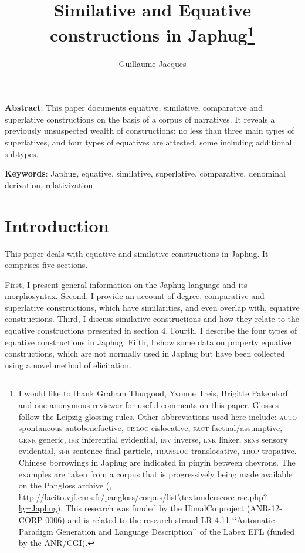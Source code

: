 \documentclass[oneside,a4paper,12pt]{article}
\begin{document}
 

\title{Similative and Equative constructions in Japhug\footnote{ I would like to thank Graham Thurgood, Yvonne Treis, Brigitte Pakendorf and one anonymous reviewer for useful comments on this paper. Glosses follow the Leipzig glossing rules. Other abbreviations used here include: \textsc{auto} spontaneous-autobenefactive, \textsc{cisloc} cislocative,  \textsc{fact} factual/assumptive, \textsc{genr} generic, \textsc{ifr} inferential evidential,  \textsc{inv} inverse, \textsc{lnk} linker,  \textsc{sens} sensory  evidential, \textsc{sfr} sentence final particle, \textsc{transloc} translocative, \textsc{trop} tropative.  Chinese borrowings in Japhug are indicated in pinyin between chevrons. The examples are taken from a corpus that is progressively being made available on the Pangloss archive (\citealt{michailovsky14pangloss}, 
 \url{http://lacito.vjf.cnrs.fr/pangloss/corpus/list\textunderscore rsc.php?lg=Japhug}). This research was funded by the HimalCo project (ANR-12-CORP-0006) and is related to the research strand LR-4.11 ‘‘Automatic Paradigm Generation and Language Description’’ of the Labex EFL (funded by the ANR/CGI).}}
\author{Guillaume Jacques}
\maketitle
 \linespread{1.5}
\textbf{Abstract}: This paper documents equative, similative, comparative and superlative constructions on the basis of a corpus of narratives. It reveals a previously unsuspected wealth of constructions: no less than three main types of superlatives, and four types of equatives are attested, some including additional subtypes.
 
\textbf{Keywords}: Japhug, equative, similative, superlative, comparative, denominal derivation, relativization
\section*{Introduction}
This paper deals with equative and similative constructions in Japhug. It comprises five sections.

 First, I present general information on the Japhug language and its morphosyntax. Second, I provide an account of degree, comparative and superlative constructions, which have similarities, and even overlap with, equative constructions. Third, I discuss similative constructions and how they relate to the equative constructions presented in section 4. Fourth, I describe the four types of equative constructions in Japhug. Fifth, I show some data on property equative constructions, which are not normally used in Japhug but have been collected using a novel method of elicitation.    
\end{document}
